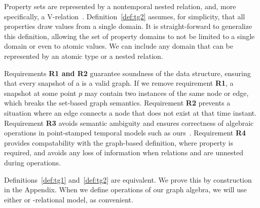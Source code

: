 Property sets are represented by a nontemporal nested relation, and,
more specifically, a V-relation~\cite{Abiteboul1995}.
Definition~\ref{def:tg2} assumes, for simplicity, that all properties
draw values from a single domain.  It is straight-forward to
generalize this definition, allowing the set of property domains to
not be limited to a single domain or even to atomic values.  We can
include any domain that can be represented by an atomic type or a
nested relation.  

Requirements {\bf R1 and R2} guarantee soundness of the \tg data
structure, ensuring that every snapshot of a \tg is a valid graph.  If
we remove requirement {\bf R1}, a snapshot at some point $p$ may
contain two instances of the same node or edge, which breaks the
set-based graph semantics.  Requirement {\bf R2} prevents a situation
where an edge connects a node that does not exist at that time
instant.  Requirement {\bf R3} avoids semantic ambiguity and ensures
correctness of algebraic operations in point-stamped temporal models
such as ours~\cite{DBLP:reference/db/JensenS09k}.  Requirement {\bf
  R4} provides compatability with the graph-based definition, where
property  is required, and avoids any loss of information
when relations \tv and \te are unnested during operations.

Definitions~\ref{def:tg1} and~\ref{def:tg2} are equivalent.  We prove
this by construction in the Appendix.  When we define operations of
our graph algebra, we will use either \tg or \tg-relational model, as
convenient.
